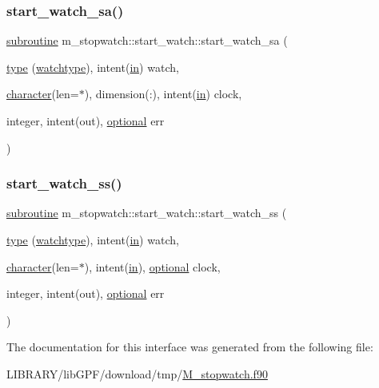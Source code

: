 \subsubsection{\texorpdfstring{start\+\_\+watch\+\_\+sa()}{start\_watch\_sa()}}
{\footnotesize\ttfamily \hyperlink{M__stopwatch_83_8txt_acfbcff50169d691ff02d4a123ed70482}{subroutine} m\+\_\+stopwatch\+::start\+\_\+watch\+::start\+\_\+watch\+\_\+sa (\begin{DoxyParamCaption}\item[{\hyperlink{stop__watch_83_8txt_a70f0ead91c32e25323c03265aa302c1c}{type} (\hyperlink{structm__stopwatch_1_1watchtype}{watchtype}), intent(\hyperlink{M__journal_83_8txt_afce72651d1eed785a2132bee863b2f38}{in})}]{watch,  }\item[{\hyperlink{option__stopwatch_83_8txt_abd4b21fbbd175834027b5224bfe97e66}{character}(len=$\ast$), dimension(\+:), intent(\hyperlink{M__journal_83_8txt_afce72651d1eed785a2132bee863b2f38}{in})}]{clock,  }\item[{integer, intent(out), \hyperlink{option__stopwatch_83_8txt_aa4ece75e7acf58a4843f70fe18c3ade5}{optional}}]{err }\end{DoxyParamCaption})\hspace{0.3cm}{\ttfamily [private]}}

\mbox{\label{interfacem__stopwatch_1_1start__watch_adce067869bbe353d88dff743f81308d1}} 
\subsubsection{\texorpdfstring{start\+\_\+watch\+\_\+ss()}{start\_watch\_ss()}}
{\footnotesize\ttfamily \hyperlink{M__stopwatch_83_8txt_acfbcff50169d691ff02d4a123ed70482}{subroutine} m\+\_\+stopwatch\+::start\+\_\+watch\+::start\+\_\+watch\+\_\+ss (\begin{DoxyParamCaption}\item[{\hyperlink{stop__watch_83_8txt_a70f0ead91c32e25323c03265aa302c1c}{type} (\hyperlink{structm__stopwatch_1_1watchtype}{watchtype}), intent(\hyperlink{M__journal_83_8txt_afce72651d1eed785a2132bee863b2f38}{in})}]{watch,  }\item[{\hyperlink{option__stopwatch_83_8txt_abd4b21fbbd175834027b5224bfe97e66}{character}(len=$\ast$), intent(\hyperlink{M__journal_83_8txt_afce72651d1eed785a2132bee863b2f38}{in}), \hyperlink{option__stopwatch_83_8txt_aa4ece75e7acf58a4843f70fe18c3ade5}{optional}}]{clock,  }\item[{integer, intent(out), \hyperlink{option__stopwatch_83_8txt_aa4ece75e7acf58a4843f70fe18c3ade5}{optional}}]{err }\end{DoxyParamCaption})\hspace{0.3cm}{\ttfamily [private]}}



The documentation for this interface was generated from the following file\+:\begin{DoxyCompactItemize}
\item 
L\+I\+B\+R\+A\+R\+Y/lib\+G\+P\+F/download/tmp/\hyperlink{M__stopwatch_8f90}{M\+\_\+stopwatch.\+f90}\end{DoxyCompactItemize}
